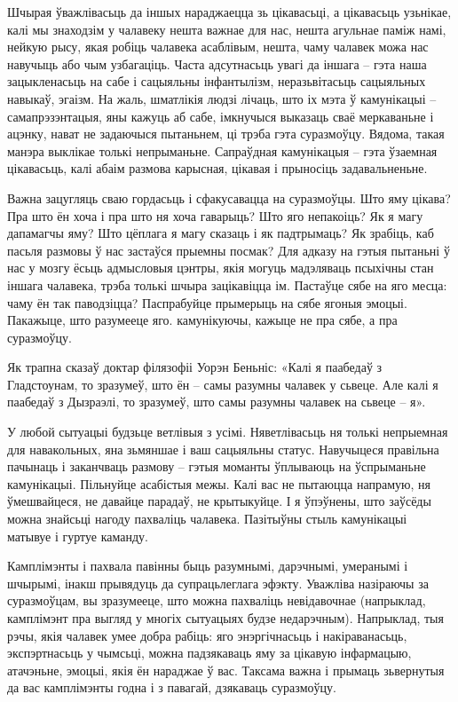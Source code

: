Шчырая ўважлівасьць да іншых нараджаецца зь цікавасьці, а цікавасьць узьнікае, калі мы знаходзім у чалавеку нешта важнае для нас, нешта агульнае паміж намі, нейкую рысу, якая робіць чалавека асаблівым, нешта, чаму чалавек можа нас навучыць або чым узбагаціць. Часта адсутнасьць увагі да іншага – гэта наша зацыкленасьць на сабе і сацыяльны інфантылізм, неразьвітасьць сацыяльных навыкаў, эгаізм. На жаль, шматлікія людзі лічаць, што іх мэта ў камунікацыі – самапрэзэнтацыя, яны кажуць аб сабе, імкнучыся выказаць сваё меркаваньне і ацэнку, нават не задаючыся пытаньнем, ці трэба гэта суразмоўцу. Вядома, такая манэра выклікае толькі непрыманьне. Сапраўдная камунікацыя – гэта ўзаемная цікавасьць, калі абаім размова карысная, цікавая і прыносіць задавальненьне.

Важна зацугляць сваю гордасьць і сфакусавацца на суразмоўцы. Што яму цікава? Пра што ён хоча і пра што ня хоча гаварыць? Што яго непакоіць? Як я магу дапамагчы яму? Што цёплага я магу сказаць і як падтрымаць? Як зрабіць, каб пасьля размовы ў нас застаўся прыемны посмак? Для адказу на гэтыя пытаньні ў нас у мозгу ёсьць адмысловыя цэнтры, якія могуць мадэляваць псыхічны стан іншага чалавека, трэба толькі шчыра зацікавіцца ім. Пастаўце сябе на яго месца: чаму ён так паводзіцца? Паспрабуйце прымерыць на сябе ягоныя эмоцыі. Пакажыце, што разумееце яго. камунікуючы, кажыце не пра сябе, а пра суразмоўцу.

Як трапна сказаў доктар філязофіі Уорэн Беньніс: «Калі я паабедаў з Гладстоунам, то зразумеў, што ён – самы разумны чалавек у сьвеце. Але калі я паабедаў з Дызраэлі, то зразумеў, што самы разумны чалавек на сьвеце – я».

У любой сытуацыі будзьце ветлівыя з усімі. Няветлівасьць ня толькі непрыемная для навакольных, яна зьмяншае і ваш сацыяльны статус. Навучыцеся правільна пачынаць і заканчваць размову – гэтыя моманты ўплываюць на ўспрыманьне камунікацыі. Пільнуйце асабістыя межы. Калі вас не пытаюцца напрамую, ня ўмешвайцеся, не давайце парадаў, не крытыкуйце. І я ўпэўнены, што заўсёды можна знайсьці нагоду пахваліць чалавека. Пазітыўны стыль камунікацыі матывуе і гуртуе каманду.

Камплімэнты і пахвала павінны быць разумнымі, дарэчнымі, умеранымі і шчырымі, інакш прывядуць да супрацьлеглага эфэкту. Уважліва назіраючы за суразмоўцам, вы зразумееце, што можна пахваліць невідавочнае (напрыклад, камплімэнт пра выгляд у многіх сытуацыях будзе недарэчным). Напрыклад, тыя рэчы, якія чалавек умее добра рабіць: яго энэргічнасьць і накіраванасьць, экспэртнасьць у чымсьці, можна падзякаваць яму за цікавую інфармацыю, атачэньне, эмоцыі, якія ён нараджае ў вас. Таксама важна і прымаць зьвернутыя да вас камплімэнты годна і з павагай, дзякаваць суразмоўцу.

